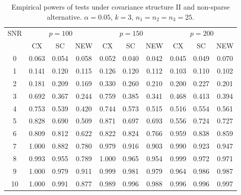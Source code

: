 \documentclass[12pt]{article} %
\theoremstyle{definition}
\begin{document}
\begin{table}[!hbp]
    \caption{Empirical powers of tests under covariance structure II and non-sparse alternative. $\alpha=0.05$, $k=3$, $n_1=n_2=n_3=25$. }
    \label{table5}
    \centering
\begin{tabular}{*{10}{c}}
\toprule
\multirow{2}{*}{SNR} &\multicolumn{3}{c}{$p=100$}&\multicolumn{3}{c}{$p=150$}&\multicolumn{3}{c}{$p=200$} \\
    \cmidrule(r){2-4}\cmidrule(r){5-7}\cmidrule(r){8-10}
        & CX & SC & NEW & CX &SC &NEW &CX & SC & NEW\\
\midrule
0 & 0.063 & 0.054 & 0.058 & 0.052 & 0.040 & 0.042 & 0.045 & 0.049 & 0.070 \\ 
1 & 0.141 & 0.120 & 0.115 & 0.126 & 0.120 & 0.112 & 0.103 & 0.110 & 0.102 \\ 
2 & 0.181 & 0.209 & 0.169 & 0.330 & 0.260 & 0.210 & 0.200 & 0.227 & 0.201 \\ 
3 & 0.692 & 0.367 & 0.244 & 0.759 & 0.385 & 0.341 & 0.468 & 0.413 & 0.394 \\ 
4 & 0.753 & 0.539 & 0.420 & 0.744 & 0.573 & 0.515 & 0.516 & 0.554 & 0.561 \\ 
5 & 0.828 & 0.690 & 0.509 & 0.871 & 0.697 & 0.693 & 0.556 & 0.724 & 0.727 \\ 
6 & 0.809 & 0.812 & 0.622 & 0.822 & 0.824 & 0.766 & 0.959 & 0.838 & 0.859 \\ 
7 & 1.000 & 0.882 & 0.780 & 0.979 & 0.916 & 0.903 & 0.990 & 0.923 & 0.947 \\ 
8 & 0.993 & 0.955 & 0.789 & 1.000 & 0.965 & 0.954 & 0.999 & 0.972 & 0.971 \\ 
9 & 1.000 & 0.979 & 0.911 & 0.999 & 0.981 & 0.979 & 0.964 & 0.986 & 0.987 \\ 
10 & 1.000 & 0.991 & 0.877 & 0.989 & 0.996 & 0.988 & 0.996 & 0.996 & 0.997 \\ 
\bottomrule
\end{tabular}
\end{table}
\end{document}
